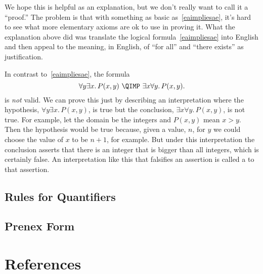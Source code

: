 We hope this is helpful as an explanation, but we don't really want to
call it a ``proof.''  The problem is that with something as basic
as~\eqref{eaimpliesae}, it's hard to see what more elementary axioms
are ok to use in proving it.  What the explanation above did was
translate the logical formula~\eqref{eaimpliesae} into English and
then appeal to the meaning, in English, of ``for all'' and ``there
exists'' as justification.

\iffalse
So this wasn't a proof, just an explanation intended to make 
what~\eqref{eaimpliesae} means, it becomes obvious.
\fi

In contrast to~\eqref{eaimpliesae}, the formula
\begin{equation}\label{aenotimplyea}
\forall y \exists x.\, P(x,y)\ \QIMP\ \exists x \forall y.\, P(x,y).
\end{equation}
is \emph{not} valid.  We can prove this just by describing an
interpretation where the hypothesis, $\forall y \exists x.\, P(x,y)$, is
true but the conclusion, $\exists x \forall y.\, P(x,y)$, is not true.
For example, let the domain be the integers and $P(x,y)$ mean $x > y$.
Then the hypothesis would be true because, given a value, $n$, for $y$ we
could choose the value of $x$ to be $n+1$, for example.  But under this
interpretation the conclusion asserts that there is an integer that is
bigger than all integers, which is certainly false.  An interpretation
like this that falsifies an assertion is called a  to
that assertion.

\begin{problems}

\practiceproblems
{}

\classproblems
{}

\homeworkproblems
{}

\examproblems
{}

\end{problems}

\begin{editingnotes}
\section{Rules for Quantifiers}

\subsection{Prenex Form}

\end{editingnotes}

\section{References}

 \cite{GareyJohnson}

\endinput
